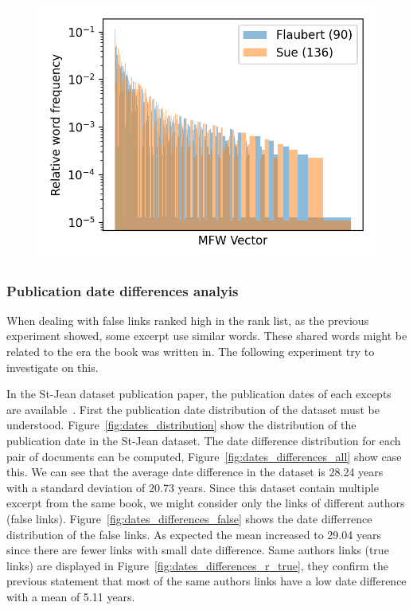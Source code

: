 \begin{figure}
  \label{fig:mfw_vector_last_rl}
  \includegraphics[width=\linewidth]{img/mfw_vector_last_rl.png}
\end{figure}

\subsubsection{Publication date differences analyis}

When dealing with false links ranked high in the rank list, as the previous experiment showed, some excerpt use similar words.
These shared words might be related to the era the book was written in.
The following experiment try to investigate on this.

In the St-Jean dataset publication paper, the publication dates of each excepts are available~\cite{st_jean}.
First the publication date distribution of the dataset must be understood.
Figure~\ref{fig:dates_distribution} show the distribution of the publication date in the St-Jean dataset.
The date difference distribution for each pair of documents can be computed, Figure~\ref{fig:dates_differences_all} show case this.
We can see that the average date difference in the dataset is 28.24 years with a standard deviation of 20.73 years.
Since this dataset contain multiple excerpt from the same book, we might consider only the links of different authors (false links).
Figure~\ref{fig:dates_differences_false} shows the date differrence distribution of the false links.
As expected the mean increased to 29.04 years since there are fewer links with small date difference.
Same authors links (true links) are displayed in Figure~\ref{fig:dates_differences_r_true}, they confirm the previous statement that most of the same authors links have a low date difference with a mean of 5.11 years.

